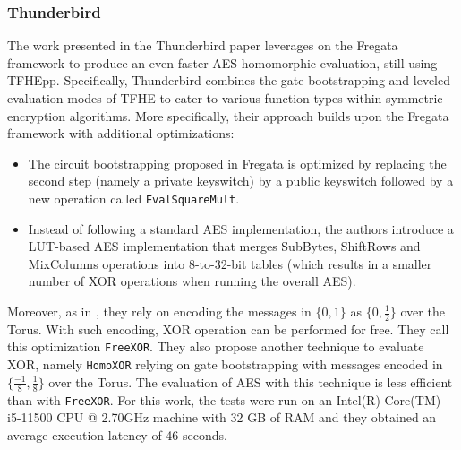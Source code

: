 \subsubsection{Thunderbird \cite{TCHES:WLWLLW24}}
\label{sec:thunderbird}
The work presented in the Thunderbird paper leverages on the Fregata framework to produce an even faster \gls{AES} homomorphic evaluation, still using TFHEpp. Specifically, Thunderbird combines the gate bootstrapping and leveled evaluation modes of \gls{TFHE} to cater to various function types within symmetric encryption algorithms. More specifically, their approach builds upon the Fregata framework with additional optimizations:
\begin{itemize}
    \item The circuit bootstrapping proposed in Fregata is optimized by replacing the second step (namely a private keyswitch) by a public keyswitch followed by a new operation called \texttt{EvalSquareMult}.
    \item  Instead of following a standard \gls{AES} implementation, the authors introduce a \gls{LUT}-based \gls{AES} implementation that merges SubBytes, ShiftRows and MixColumns operations into 8-to-32-bit tables (which results in a smaller number of XOR operations when running the overall \gls{AES}).
\end{itemize}
Moreover, as in \cite{ISC:WWLLL23}, they rely on encoding the messages in $\{0, 1\}$ as $\{0, \frac{1}{2}\}$ over the Torus. With such encoding, XOR operation can be performed for free. They call this optimization \texttt{FreeXOR}. They also propose another technique to evaluate XOR, namely \texttt{HomoXOR} relying on gate bootstrapping with messages encoded in $\{\frac{-1}{8}, \frac{1}{8}\}$ over the Torus. The evaluation of \gls{AES} with this technique is less efficient than with \texttt{FreeXOR}. For this work, the tests were run on an Intel(R) Core(TM) i5-11500 CPU @ 2.70GHz machine with 32 GB of RAM and they obtained an average execution latency of 46 seconds.



